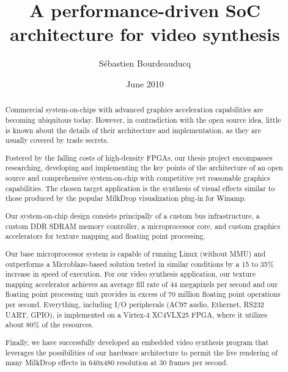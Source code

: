 \documentclass[a4paper,11pt]{kthesis}
\title{A performance-driven SoC architecture for video synthesis}
\date{June 2010}
\author{S\'ebastien Bourdeauducq}
\begin{document}
\begin{abstract}
Commercial system-on-chips with advanced graphics acceleration capabilities are becoming ubiquitous today. However, in contradiction with the open source idea, little is known about the details of their architecture and implementation, as they are usually covered by trade secrets.

Fostered by the falling costs of high-density FPGAs, our thesis project encompasses researching, developing and implementing the key points of the architecture of an open source and comprehensive system-on-chip with competitive yet reasonable graphics capabilities. The chosen target application is the synthesis of visual effects similar to those produced by the popular MilkDrop visualization plug-in for Winamp.

Our system-on-chip design consists principally of a custom bus infrastructure, a custom DDR SDRAM memory controller, a microprocessor core, and custom graphics accelerators for texture mapping and floating point processing.

Our base microprocessor system is capable of running Linux (without MMU) and outperforms a Microblaze-based solution tested in similar conditions by a 15 to 35\% increase in speed of execution. For our video synthesis application, our texture mapping accelerator achieves an average fill rate of 44 megapixels per second and our floating point processing unit provides in excess of 70 million floating point operations per second. Everything, including I/O peripherals (AC97 audio, Ethernet, RS232 UART, GPIO), is implemented on a Virtex-4 XC4VLX25 FPGA, where it utilizes about 80\% of the resources.

Finally, we have successfully developed an embedded video synthesis program that leverages the possibilities of our hardware architecture to permit the live rendering of many MilkDrop effects in 640x480 resolution at 30 frames per second.
\end{abstract}
\end{document}
